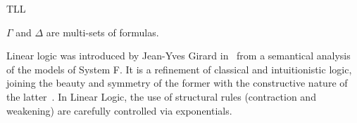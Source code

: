 \begin{entry}{TLL}
\begin{calculus}
\end{calculus}


\begin{clarifications}
$\Gamma$ and $\Delta$ are multi-sets of formulas.
\end{clarifications}

\begin{history}
  Linear logic was introduced by Jean-Yves Girard in~\cite{girard87tcs} from a semantical analysis of the models of System F.  It is  a refinement of classical and intuitionistic logic, joining the  beauty and symmetry of the former with the constructive nature of the latter~\cite{sep-logic-linear}. In Linear Logic, the  use of structural rules (contraction and weakening) are carefully controlled via exponentials.
\end{history}



%
%
%
%
%
%
% 
%




\end{entry}
